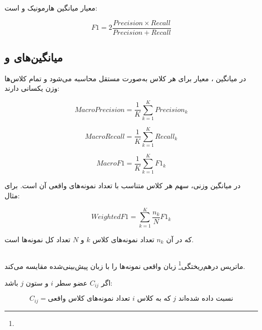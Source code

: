 معیار
میانگین هارمونیک
و
است:

\begin{equation}
F1
=
2
\frac{
Precision
\times
Recall
}{
Precision+Recall
}
\end{equation}


\subsection{میانگین‌های  و }

در میانگین
،
معیار برای هر کلاس به‌صورت مستقل محاسبه می‌شود و تمام کلاس‌ها وزن یکسانی دارند:

\begin{equation}
MacroPrecision
=
\frac{1}{K}
\sum_{k=1}^{K}Precision_k
\end{equation}

\begin{equation}
MacroRecall
=
\frac{1}{K}
\sum_{k=1}^{K}Recall_k
\end{equation}

\begin{equation}
MacroF1
=
\frac{1}{K}
\sum_{k=1}^{K}
F1_k
\end{equation}

در میانگین وزنی، سهم هر کلاس متناسب با تعداد نمونه‌های واقعی آن است. برای مثال:

\begin{equation}
WeightedF1
=
\sum_{k=1}^{K}
\frac{n_k}{N}F1_k
\end{equation}

که در آن $n_k$ تعداد نمونه‌های کلاس $k$ و $N$ تعداد کل نمونه‌ها است.


\subsection{}

ماتریس درهم‌ریختگی\footnote{} زبان واقعی نمونه‌ها را با زبان پیش‌بینی‌شده مقایسه می‌کند.

اگر $C_{ij}$ عضو سطر $i$ و ستون $j$ باشد:

\begin{equation}
C_{ij}
=
\text{تعداد نمونه‌های کلاس واقعی }i
\text{ که به کلاس }j
\text{ نسبت داده شده‌اند}
\end{equation}

